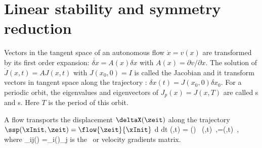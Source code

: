 
\section{Linear stability and symmetry reduction}
\label{sec:stability}

Vectors in the tangent space of an autonomous flow $\dot{x} =v(x)$ are 
transformed by its first order expansion:
$\dot{\delta x} = A(x) \delta x$ with $A(x)=\partial v / \partial x$.
The solution of $\dot{J}(x,t) = AJ(x,t)$ with $J(x_0,0) = I$ is called
the Jacobian and it transform vectors in tangent space
along the trajectory : $\delta x(t) = J(x_0,0) \delta x_0$.
For a periodic orbit, the eigenvalues and eigenvectors 
of $J_p(x) = J(x, T)$ are called \Fm s and \Fv s. 
Here $T$ is the period 
of this orbit.

A flow transports the
displacement $\deltaX (\zeit)$ along the trajectory
$\ssp(\xInit,\zeit) = \flow{\zeit}{\xInit}$
\beq
{d \over dt} \deltaX(\xInit,t) =
{\Mvar}(\ssp) \,  \deltaX(\xInit,t)
	\,,\qquad \ssp=\ssp(\xInit,t)
\,,
\label{lin_odes}
\eeq
where
\beq
{\Mvar}_{ij}(\ssp) ={\pde \vel_i(\ssp)\over \pde \ssp_j  }
is the \stabmat\ or
velocity gradients matrix.


